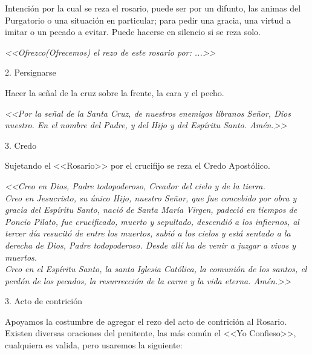 \documentclass[12pt, letterpaper]{report}
\begin{document}
    \Large Intención por la cual se reza el rosario, puede ser por un difunto, las animas del Purgatorio o una situación en particular; para pedir una gracia, una virtud a imitar o un pecado a evitar. Puede hacerse en silencio si se reza solo.
    
    \textit{<<Ofrezco(Ofrecemos) el rezo de este rosario por: ...>>}
    
    \LARGE 2. Persignarse
    
    \Large Hacer la señal de la cruz sobre la frente, la cara y el pecho. 
    
    \textit{<<Por la señal de la Santa Cruz, de nuestros enemigos líbranos Señor, Dios nuestro. En el nombre del Padre, y del Hijo y del Espíritu Santo. Amén.>>}
    
    
    \LARGE 3. Credo
    
    \Large Sujetando el <<Rosario>> por el crucifijo se reza el Credo Apostólico.
    
    \textit{<<Creo en Dios, Padre todopoderoso, Creador del cielo y de la tierra.\\
    Creo en Jesucristo, su único Hijo, nuestro Señor, que fue concebido por obra y gracia del Espíritu Santo, nació de Santa María Virgen, padeció en tiempos de Poncio Pilato, fue crucificado, muerto y sepultado, descendió a los infiernos, al tercer día resucitó de entre los muertos, subió a los cielos y está sentado a la derecha de Dios, Padre todopoderoso. Desde allí ha de venir a juzgar a vivos y muertos.\\
    Creo en el Espíritu Santo, la santa Iglesia Católica, la comunión de los santos, el perdón de los pecados, la resurrección de la carne y la vida eterna. Amén.>>}
    
    
    \LARGE 3. Acto de contrición
    
    \Large Apoyamos la costumbre de agregar el rezo del acto de contrición al Rosario. Existen diversas oraciones del penitente, las más común el <<Yo Confieso>>, cualquiera es valida, pero usaremos la siguiente:
    
\end{document}
